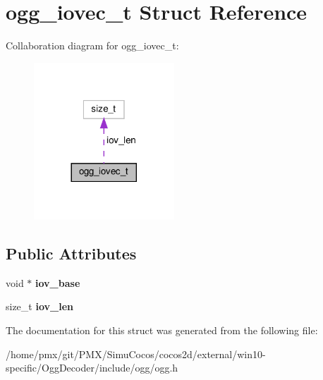 \hypertarget{structogg__iovec__t}{}\section{ogg\+\_\+iovec\+\_\+t Struct Reference}
\label{structogg__iovec__t}


Collaboration diagram for ogg\+\_\+iovec\+\_\+t\+:
\nopagebreak
\begin{figure}[H]
\begin{center}
\leavevmode
\includegraphics[width=149pt]{structogg__iovec__t__coll__graph}
\end{center}
\end{figure}
\subsection*{Public Attributes}
\begin{DoxyCompactItemize}
\item 
\mbox{\label{structogg__iovec__t_a0f663ecfcbdf22457f38f9308dd67166}} 
void $\ast$ {\bfseries iov\+\_\+base}
\item 
\mbox{\label{structogg__iovec__t_a52b887e0511104920cdc181c9e4136ce}} 
size\+\_\+t {\bfseries iov\+\_\+len}
\end{DoxyCompactItemize}


The documentation for this struct was generated from the following file\+:\begin{DoxyCompactItemize}
\item 
/home/pmx/git/\+P\+M\+X/\+Simu\+Cocos/cocos2d/external/win10-\/specific/\+Ogg\+Decoder/include/ogg/ogg.\+h\end{DoxyCompactItemize}
